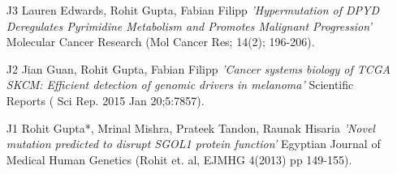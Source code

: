 \documentclass[line,margin]{cv_type2}
\begin{document}
\begin{resume}
                     \begin{itemize}
                     \item[J3] {Lauren Edwards, Rohit Gupta, Fabian Filipp \it{'Hypermutation of {\small {DPYD}} Deregulates Pyrimidine Metabolism and Promotes Malignant Progression'}}\hskip 5pt {Molecular Cancer Research}{\small{ (Mol Cancer Res; 14(2); 196-}{206).}}
                     \vskip 2pt
                     \item[J2] {Jian Guan, Rohit Gupta, Fabian Filipp \it{'Cancer systems biology of TCGA SKCM: Efficient detection of genomic drivers in melanoma'}} \hskip 5pt {Scientific Reports} {\small{( Sci Rep. 2015 Jan 20;5:7857).}}
                     \vskip 2pt
                     \item[J1] {Rohit Gupta*, Mrinal Mishra, Prateek Tandon, Raunak Hisaria \it{'Novel mutation predicted to disrupt SGOL1 protein function'}} \hskip 5pt {Egyptian Journal of Medical Human Genetics }{\small{(Rohit et. al, EJMHG 4(2013) pp 149-155).}}
                     \end{itemize}

                \vskip 10pt
                

\end{resume}
\end{document}
